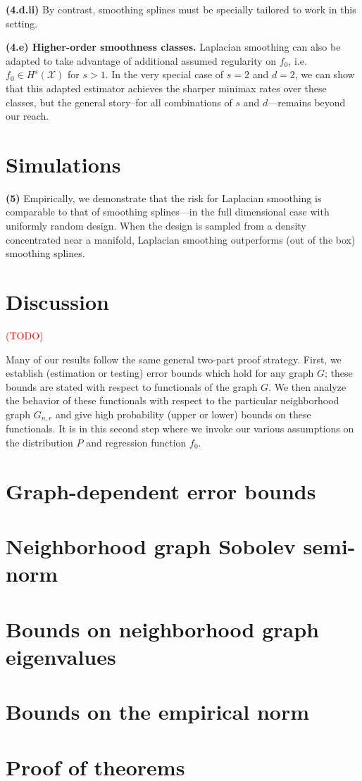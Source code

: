 \documentclass{article}
\newcommand{\1}{\mathbf{1}}
\newcommand{\Xset}{\mathcal{X}}
\newcommand{\mc}[1]{\mathcal{#1}}
\theoremstyle{alden}
\theoremstyle{aldenthm}
\theoremstyle{definition}
\theoremstyle{remark}
\begin{document}
\quad \textbf{(4.d.ii)} By contrast, smoothing splines must be specially tailored to work in this setting.

\textbf{(4.e) Higher-order smoothness classes.} Laplacian smoothing can also be adapted to take advantage of additional assumed regularity on $f_0$, i.e. $f_0 \in H^s(\mc{\Xset})$ for $s > 1$. In the very special case of $s = 2$ and $d = 2$, we can show that this adapted estimator achieves the sharper minimax rates over these classes, but the general story--for all combinations of $s$ and $d$---remains beyond our reach.

\section{Simulations}

\textbf{(5)} Empirically, we demonstrate that the risk for Laplacian smoothing is comparable to that of smoothing splines---in the full dimensional case with uniformly random design. When the design is sampled from a density concentrated near a manifold, Laplacian smoothing outperforms (out of the box) smoothing splines.

\section{Discussion}

\textcolor{red}{(TODO)}

\clearpage

\appendix

\clearpage

Many of our results follow the same general two-part proof strategy. First, we establish (estimation or testing) error bounds which hold for any graph $G$; these bounds are stated with respect to functionals of the graph $G$. We then analyze the behavior of these functionals with respect to the particular neighborhood graph $G_{n,r}$ and give high probability (upper or lower) bounds on these functionals. It is in this second step where we invoke our various assumptions on the distribution $P$ and regression function $f_0$.

\section{Graph-dependent error bounds}
\label{sec:fixed_graph_error_bounds}

\section{Neighborhood graph Sobolev semi-norm}
\label{sec:graph_sobolev_seminorm}


\section{Bounds on neighborhood graph eigenvalues}
\label{sec:graph_eigenvalues}

\section{Bounds on the empirical norm}
\label{sec:empirical_norm}

\section{Proof of theorems}


 
\end{document}
